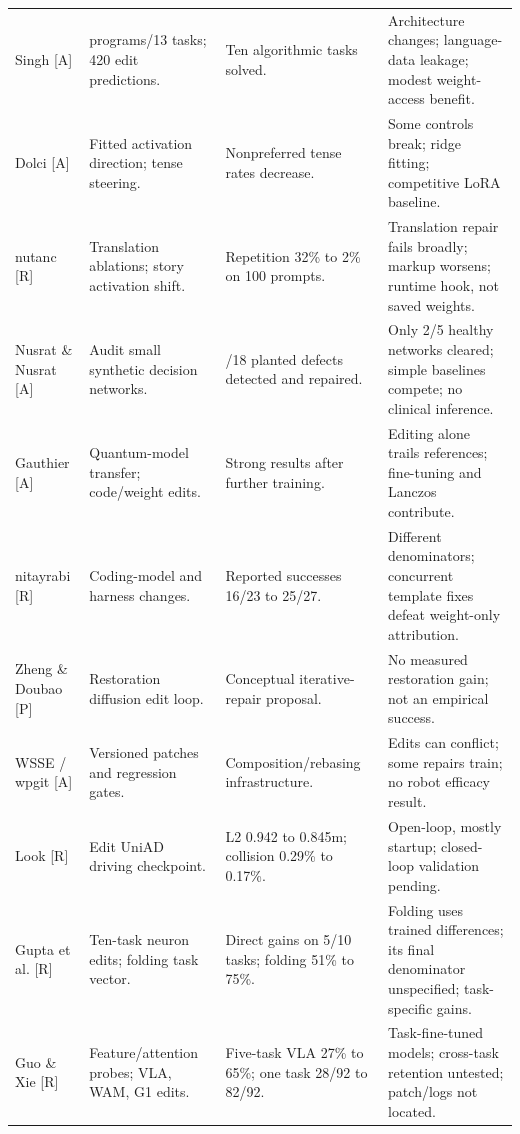 \begin{table}[!t]
\begin{tabularx}{\textwidth}{@{}>{\RaggedRight\arraybackslash}p{}>{\RaggedRight\arraybackslash}p{}>{\RaggedRight\arraybackslash}p{}>{\RaggedRight\arraybackslash}X@{}}
Singh [A] \citep{singh2026} & 959 programs/13 tasks; 420 edit predictions. & Ten algorithmic tasks solved. & Architecture changes; language-data leakage; modest weight-access benefit. \\
Dolci [A] \citep{dolci2026} & Fitted activation direction; tense steering. & Nonpreferred tense rates decrease. & Some controls break; ridge fitting; competitive LoRA baseline. \\
nutanc [R] \citep{nutanc2026} & Translation ablations; story activation shift. & Repetition 32\% to 2\% on 100 prompts. & Translation repair fails broadly; markup worsens; runtime hook, not saved weights. \\
Nusrat \& Nusrat [A] \citep{nusrat2026} & Audit small synthetic decision networks. & 16/18 planted defects detected and repaired. & Only 2/5 healthy networks cleared; simple baselines compete; no clinical inference. \\
Gauthier [A] \citep{gauthier2026} & Quantum-model transfer; code/weight edits. & Strong results after further training. & Editing alone trails references; fine-tuning and Lanczos contribute. \\
nitayrabi [R] \citep{nitayrabi2026} & Coding-model and harness changes. & Reported successes 16/23 to 25/27. & Different denominators; concurrent template fixes defeat weight-only attribution. \\
Zheng \& Doubao [P] \citep{zheng2026} & Restoration diffusion edit loop. & Conceptual iterative-repair proposal. & No measured restoration gain; not an empirical success. \\
WSSE / wpgit [A] \citep{wsse2026} & Versioned patches and regression gates. & Composition/rebasing infrastructure. & Edits can conflict; some repairs train; no robot efficacy result. \\
Look [R] \citep{look2026uniad} & Edit UniAD driving checkpoint. & L2 0.942 to 0.845m; collision 0.29\% to 0.17\%. & Open-loop, mostly startup; closed-loop validation pending. \\
Gupta et al. [R] \citep{gupta2026robotweights} & Ten-task neuron edits; folding task vector. & Direct gains on 5/10 tasks; folding 51\% to 75\%. & Folding uses trained differences; its final denominator unspecified; task-specific gains. \\
Guo \& Xie [R] \citep{guo2026robotweights,xie2026robotweights} & Feature/attention probes; VLA, WAM, G1 edits. & Five-task VLA 27\% to 65\%; one task 28/92 to 82/92. & Task-fine-tuned models; cross-task retention untested; patch/logs not located. \\

\end{tabularx}
\end{table}
